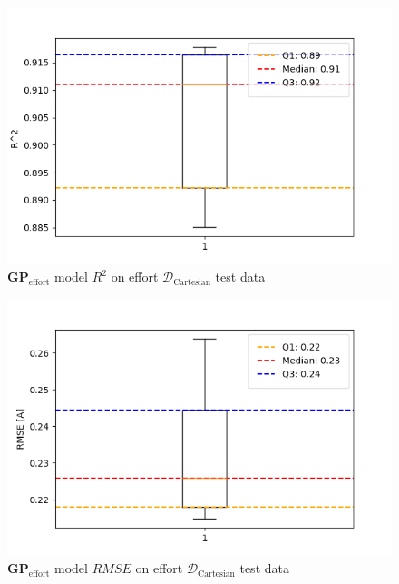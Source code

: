     \begin{figure}[H]
    \centering
    \includegraphics[width=1\columnwidth]{Images/05_results/effort_boxplot_test_non_OC_R^2.png}
    \caption[\(\boldsymbol{GP}_{\text{effort}}\) model \(R^2\) on effort \(\mathcal{D}_{\text{Cartesian}}\) test data]{\(\boldsymbol{GP}_{\text{effort}}\) model \(R^2\) on effort \(\mathcal{D}_{\text{Cartesian}}\) test data}
    \label{fig:effort_no_oc_R^2_test}
    \end{figure}

    \begin{figure}[H]
    \centering
    \includegraphics[width=1\columnwidth]{Images/05_results/effort_boxplot_test_non_OC_RMSE.png}
    \caption[\(\boldsymbol{GP}_{\text{effort}}\) model \(RMSE\) on effort \(\mathcal{D}_{\text{Cartesian}}\) test data]{\(\boldsymbol{GP}_{\text{effort}}\) model \(RMSE\) on effort \(\mathcal{D}_{\text{Cartesian}}\) test data}
    \label{fig:effort_no_oc_RMSE_test}
    \end{figure}
    
